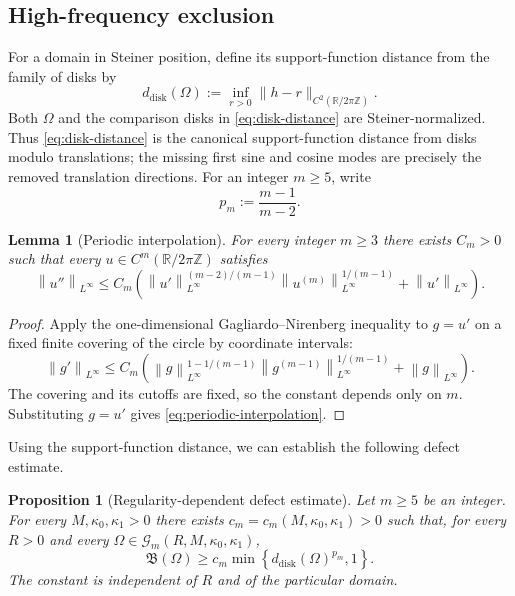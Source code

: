 \documentclass[12pt]{article}
\newcommand{\R}{\mathbb{R}}
\numberwithin{equation}{section}
\newtheorem{lemma}[theorem]{Lemma}
\newtheorem{proposition}[theorem]{Proposition}
\numberwithin{equation}{section}
\newcommand{\cG}{\mathcal{G}}
\begin{document}
\subsection{High-frequency exclusion}

For a domain in Steiner position, define its support-function distance from
the family of disks by
\begin{equation}\label{eq:disk-distance}
 d_{\mathrm{disk}}(\Omega)
 :=\inf_{r>0}\|h-r\|_{C^2(\R/2\pi\mathbb Z)}.
\end{equation}
Both $\Omega$ and the comparison disks in \eqref{eq:disk-distance} are
Steiner-normalized.  Thus \eqref{eq:disk-distance} is the canonical
support-function distance from disks modulo translations; the missing first
sine and cosine modes are precisely the removed translation directions.
For an integer $m\geq5$, write
\begin{equation*}\label{eq:p-m}
 p_m:=\frac{m-1}{m-2}.
\end{equation*}

\begin{lemma}[Periodic interpolation]\label{lem:periodic-interpolation}
For every integer $m\geq3$ there exists $C_m>0$ such that every
$u\in C^m\left(\R/2\pi\mathbb Z\right)$ satisfies
\begin{equation}\label{eq:periodic-interpolation}
 \left\|u''\right\|_{L^\infty}
 \leq C_m\left(
 \left\|u'\right\|_{L^\infty}^{(m-2)/(m-1)}
 \left\|u^{(m)}\right\|_{L^\infty}^{1/(m-1)}
 +\left\|u'\right\|_{L^\infty}\right).
\end{equation}
\end{lemma}

\begin{proof}
Apply the one-dimensional Gagliardo--Nirenberg inequality to $g=u'$ on a
fixed finite covering of the circle by coordinate intervals:
\[
 \left\|g'\right\|_{L^\infty}
 \leq C_m\left(
 \left\|g\right\|_{L^\infty}^{1-1/(m-1)}
 \left\|g^{(m-1)}\right\|_{L^\infty}^{1/(m-1)}
 +\left\|g\right\|_{L^\infty}\right).
\]
The covering and its cutoffs are fixed, so the constant depends only on
$m$. Substituting $g=u'$ gives \eqref{eq:periodic-interpolation}.
\end{proof}

Using the support-function distance, we can establish the following defect estimate.
\begin{proposition}[Regularity-dependent defect estimate]
\label{prop:defect-distance}
Let $m\geq5$ be an integer. For every $M,\kappa_0,\kappa_1>0$ there exists
$c_m=c_m\left(M,\kappa_0,\kappa_1\right)>0$ such that, for every $R>0$ and every
$\Omega\in\cG_m\left(R,M,\kappa_0,\kappa_1\right)$,
\begin{equation}\label{eq:defect-distance-lower}
 \mathfrak B(\Omega)
 \geq c_m
 \min\left\{d_{\mathrm{disk}}(\Omega)^{p_m},1\right\}.
\end{equation}
The constant is independent of $R$ and of the particular domain.
\end{proposition}
\end{document}

